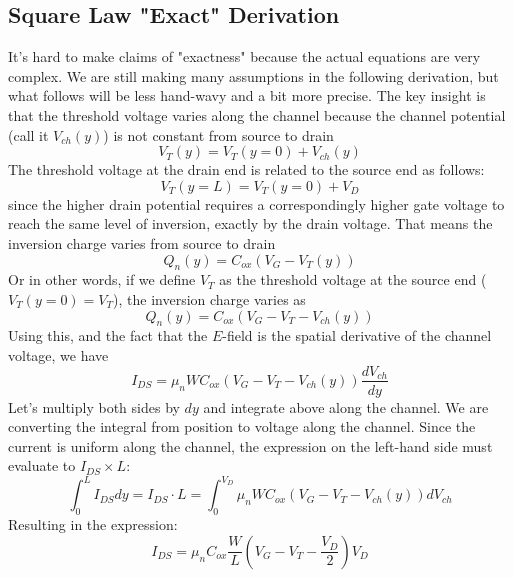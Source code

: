\subsection{Square Law "Exact" Derivation}
It's hard to make claims of "exactness" because the actual equations are very complex.  We are still making many assumptions in the following derivation, but what follows will be less hand-wavy and a bit more precise.  The key insight is that the threshold voltage varies along the channel because the channel potential (call it $V_{ch}(y)$) is not constant from source to drain
    \begin{equation} 
        V_T(y) = V_T(y= 0 ) + V_{ch}(y) 
    \end{equation}
The threshold voltage at the drain end is related to the source end as follows:
    \begin{equation} 
        V_T(y=L) = V_T(y = 0) + V_D 
    \end{equation} 
since the higher drain potential requires a correspondingly higher gate voltage to reach the same level of inversion, exactly by the drain voltage.  That means the inversion charge varies from source to drain
    \begin{equation} 
        Q_n(y) = C_{ox} (V_G - V_T(y)) 
    \end{equation}
Or in other words, if we define $V_T$ as the threshold voltage at the source end ($V_T(y=0) = V_{T}$), the inversion charge varies as
    \begin{equation} 
        Q_n(y) = C_{ox} (V_G - V_T - V_{ch}(y) )  \label{eq:invcharge}
    \end{equation}
Using this, and the fact that the $E$-field is the spatial derivative of the channel voltage, we have
    \begin{equation} 
        I_{DS} = \mu_n W C_{ox} \left(V_G - V_T - V_{ch}(y) \right) \frac{dV_{ch}}{dy} 
    \end{equation}
Let's multiply both sides by $dy$ and integrate above along the channel.  We are converting the integral from position to voltage along the channel.  Since the current is uniform along the channel, the expression on the left-hand side must evaluate to $I_{DS} \times L$:
    \begin{equation} 
        \int_0^L I_{DS} dy = I_{DS} \cdot L = \int_0^{V_D} \mu_n W C_{ox} (V_G - V_T - V_{ch}(y)) dV_{ch} 
    \end{equation}
Resulting in the expression:
    \begin{equation} 
        I_{DS} = \mu_n C_{ox} \frac{W}{L} \left( V_G - V_T - \frac{V_D}{2} \right) V_D
        \label{eq:ids_triode}
    \end{equation}
